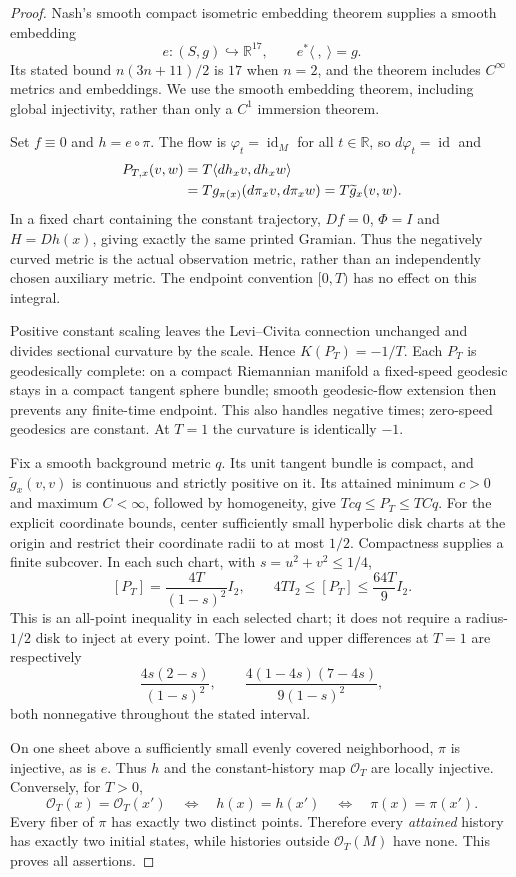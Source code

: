 \documentclass[11pt]{article}
\newcommand{\R}{\mathbb R}
\newcommand{\Obs}{\mathcal O}
\begin{document}
\begin{proof}
Nash's smooth compact isometric embedding theorem \cite[Thm.~2, p.~59]{nash}
supplies a smooth embedding
\[
 e:(S,g)\hookrightarrow\R^{17},\qquad e^*\langle\ ,\ \rangle=g.
\]
Its stated bound $n(3n+11)/2$ is $17$ when $n=2$, and the theorem includes
$C^\infty$ metrics and embeddings. We use the smooth embedding theorem,
including global injectivity, rather than only a $C^1$ immersion theorem.

Set $f\equiv0$ and $h=e\circ\pi$. The flow is $\varphi_t=\operatorname{id}_M$
for all $t\in\R$, so $d\varphi_t=\operatorname{id}$ and
\begin{align}
 P_{T,x}(v,w)
 &=T\langle dh_xv,dh_xw\rangle\notag\\
 &=Tg_{\pi(x)}(d\pi_xv,d\pi_xw)
 =T\widetilde g_x(v,w).\label{eq:identity}
\end{align}
In a fixed chart containing the constant trajectory, $Df=0$, $\Phi=I$ and
$H=Dh(x)$, giving exactly the same printed Gramian. Thus the negatively curved
metric is the actual observation metric, rather than an independently chosen
auxiliary metric. The endpoint convention $[0,T)$ has no effect on this integral.

Positive constant scaling leaves the Levi--Civita connection unchanged and
divides sectional curvature by the scale. Hence $K(P_T)=-1/T$. Each $P_T$ is
geodesically complete: on a compact Riemannian manifold a fixed-speed geodesic
stays in a compact tangent sphere bundle; smooth geodesic-flow extension then
prevents any finite-time endpoint. This also handles negative times; zero-speed
geodesics are constant. At $T=1$ the curvature is identically $-1$.

Fix a smooth background metric $q$. Its unit tangent bundle is compact, and
$\widetilde g_x(v,v)$ is continuous and strictly positive on it. Its attained
minimum $c>0$ and maximum $C<\infty$, followed by homogeneity, give
$Tcq\leq P_T\leq TCq$. For the explicit coordinate bounds, center sufficiently
small hyperbolic disk charts at the origin and restrict their coordinate radii
to at most $1/2$. Compactness supplies a finite subcover. In each such chart,
with $s=u^2+v^2\leq1/4$,
\[
 [P_T]=\frac{4T}{(1-s)^2}I_2,
 \qquad 4T I_2\leq[P_T]\leq\frac{64T}{9}I_2.
\]
This is an all-point inequality in each selected chart; it does not require a
radius-$1/2$ disk to inject at every point. The lower and upper differences at
$T=1$ are respectively
\[
 \frac{4s(2-s)}{(1-s)^2},\qquad
 \frac{4(1-4s)(7-4s)}{9(1-s)^2},
\]
both nonnegative throughout the stated interval.

On one sheet above a sufficiently small evenly covered neighborhood, $\pi$ is
injective, as is $e$. Thus $h$ and the constant-history map $\Obs_T$ are locally
injective. Conversely, for $T>0$,
\[
 \Obs_T(x)=\Obs_T(x')
 \quad\Longleftrightarrow\quad h(x)=h(x')
 \quad\Longleftrightarrow\quad\pi(x)=\pi(x').
\]
Every fiber of $\pi$ has exactly two distinct points. Therefore every
\emph{attained} history has exactly two initial states, while histories outside
$\Obs_T(M)$ have none. This proves all assertions.
\end{proof}
\end{document}
